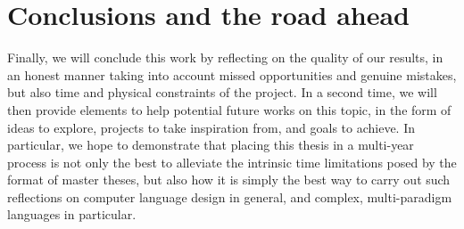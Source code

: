 \section{Conclusions and the road ahead}\label{sec:ch1-4}
Finally, we will conclude this work by reflecting on the quality of our results, in an honest manner taking into account missed opportunities and genuine mistakes, but also time and physical constraints of the project.
In a second time, we will then provide elements to help potential future works on this topic, in the form of ideas to explore, projects to take inspiration from, and goals to achieve.\newline
In particular, we hope to demonstrate that placing this thesis in a multi-year process is not only the best to alleviate the intrinsic time limitations posed by the format of master theses, but also how it is simply the best way to carry out such reflections on computer language design in general, and complex, multi-paradigm languages in particular.
